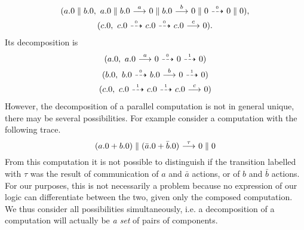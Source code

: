 \begin{gather*}
(a.0\parallel b.0,\
a.0\parallel b.0 \ {\stackrel{{a}}{\longrightarrow}}\ 
0\parallel b.0 \ {\stackrel{{b}}{\longrightarrow}}\ 
0\parallel 0 \ {\stackrel{_{0}}{\dashrightarrow}}\ 
0\parallel 0),
\\
(c.0,\ c.0 \ {\stackrel{_{0}}{\dashrightarrow}}\  c.0 \ {\stackrel{_{0}}{\dashrightarrow}}\  c.0 \ {\stackrel{{c}}{\longrightarrow}}\  0).
\end{gather*}
Its decomposition is
\begin{gather*}
    (a.0,\ a.0 \ {\stackrel{{a}}{\longrightarrow}}\  0 \ {\stackrel{_{0}}{\dashrightarrow}}\  0 \ {\stackrel{_{1}}{\dashrightarrow}}\  0) \\
    (b.0,\ b.0 \ {\stackrel{_{0}}{\dashrightarrow}}\  b.0 \ {\stackrel{{b}}{\longrightarrow}}\  0 \ {\stackrel{_{1}}{\dashrightarrow}}\  0) \\
    (c.0,\ c.0 \ {\stackrel{_{1}}{\dashrightarrow}}\  c.0 \ {\stackrel{_{1}}{\dashrightarrow}}\  c.0 \ {\stackrel{{c}}{\longrightarrow}}\  0)
\end{gather*}
%
However, the decomposition of a parallel computation 
is not in general unique, there may be several possibilities.
For example consider a computation with the following trace.
\[
     (a.0+b.0)\parallel(\bar{a}.0+\bar{b}.0) \ {\stackrel{{\tau}}{\longrightarrow}}\  0\parallel 0
\]
From this computation it is not possible to distinguish if the transition
labelled with $\tau$ was the result of communication of $a$ and $\bar a$ actions,
or of $b$ and $\bar b$ actions.
For our purposes, this is not necessarily a problem because no expression
of our logic can differentiate between the two, given only the composed
computation. We thus consider all possibilities simultaneously,
i.e. a decomposition of a computation will actually
be \emph{a set} of pairs of components.

